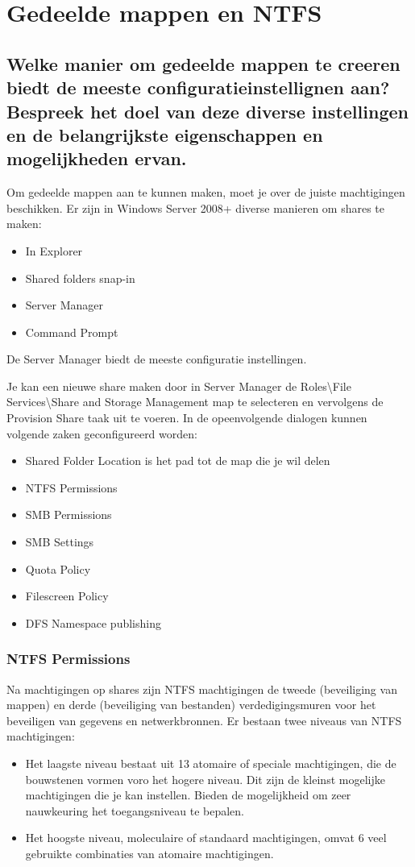 \chapter{Gedeelde mappen en NTFS}

\section{Welke manier om gedeelde mappen te creeren biedt de meeste
configuratieinstellignen aan? Bespreek het doel van deze diverse instellingen en
de belangrijkste eigenschappen en mogelijkheden ervan.}

Om gedeelde mappen aan te kunnen maken, moet je over de juiste machtigingen
beschikken. Er zijn in Windows Server 2008+ diverse manieren om shares te maken:
\begin{itemize}
	\item In Explorer
	\item Shared folders snap-in
	\item Server Manager
	\item Command Prompt
\end{itemize}

De Server Manager biedt de meeste configuratie instellingen.

Je kan een nieuwe share maken door in Server Manager de Roles\textbackslash File
Services\textbackslash Share and Storage Management map te selecteren en
vervolgens de Provision Share taak uit te voeren. In de opeenvolgende dialogen
kunnen volgende zaken geconfigureerd worden:
\begin{itemize}
	\item Shared Folder Location is het pad tot de map die je wil delen
	\item NTFS Permissions
	\item SMB Permissions
	\item SMB Settings
	\item Quota Policy
	\item Filescreen Policy
	\item DFS Namespace publishing
\end{itemize}

\subsection{NTFS Permissions}

Na machtigingen op shares zijn NTFS machtigingen de tweede (beveiliging van
mappen) en derde (beveiliging van bestanden) verdedigingsmuren voor het
beveiligen van gegevens en netwerkbronnen. Er bestaan twee niveaus van NTFS
machtigingen:
\begin{itemize}
	\item Het laagste niveau bestaat uit 13 atomaire of speciale
		machtigingen, die de bouwstenen vormen voro het hogere niveau.
		Dit zijn de kleinst mogelijke machtigingen die je kan instellen.
		Bieden de mogelijkheid om zeer nauwkeuring het toegangsniveau te
		bepalen.
	\item Het hoogste niveau, moleculaire of standaard machtigingen, omvat 6
		veel gebruikte combinaties van atomaire machtigingen.
\end{itemize}

